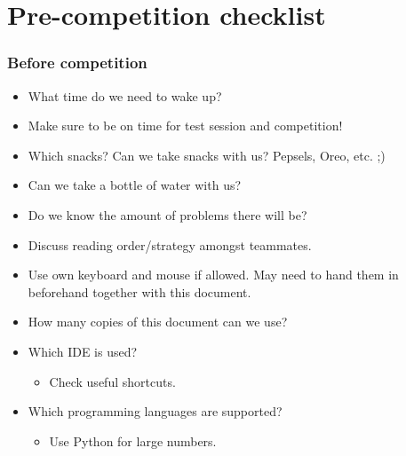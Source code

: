 \section{Pre-competition checklist}

\subsubsection{Before competition}
\begin{itemize}
    \item What time do we need to wake up?
    \item Make sure to be on time for test session and competition!
    \item Which snacks? Can we take snacks with us? Pepsels, Oreo, etc. ;)
    \item Can we take a bottle of water with us?
    \item Do we know the amount of problems there will be?
    \item Discuss reading order/strategy amongst teammates.
    \item Use own keyboard and mouse if allowed. May need to hand them in beforehand together with this document.
    \item How many copies of this document can we use?
    \item Which IDE is used?
    \begin{itemize}
        \item Check useful shortcuts.
    \end{itemize}
    \item Which programming languages are supported?
    \begin{itemize}
        \item Use Python for large numbers.
    \end{itemize}
\end{itemize}

